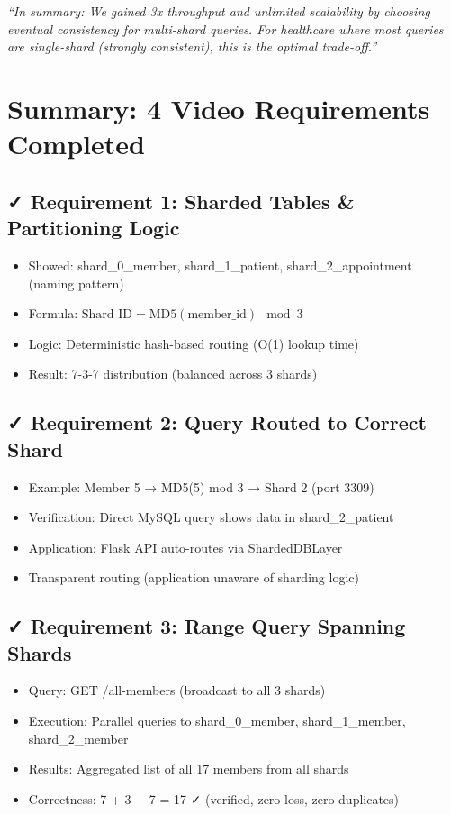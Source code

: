\documentclass[12pt]{article}
\begin{document}
\textit{``In summary: We gained 3x throughput and unlimited scalability by choosing eventual consistency for multi-shard queries. For healthcare where most queries are single-shard (strongly consistent), this is the optimal trade-off.''}

\newpage

\section*{Summary: 4 Video Requirements Completed}

\subsection*{✓ Requirement 1: Sharded Tables \& Partitioning Logic}
\begin{itemize}
    \item Showed: shard\_0\_member, shard\_1\_patient, shard\_2\_appointment (naming pattern)
    \item Formula: $\text{Shard ID} = \text{MD5}(\text{member\_id}) \mod 3$
    \item Logic: Deterministic hash-based routing (O(1) lookup time)
    \item Result: 7-3-7 distribution (balanced across 3 shards)
\end{itemize}

\subsection*{✓ Requirement 2: Query Routed to Correct Shard}
\begin{itemize}
    \item Example: Member 5 → MD5(5) mod 3 → Shard 2 (port 3309)
    \item Verification: Direct MySQL query shows data in shard\_2\_patient
    \item Application: Flask API auto-routes via ShardedDBLayer
    \item Transparent routing (application unaware of sharding logic)
\end{itemize}

\subsection*{✓ Requirement 3: Range Query Spanning Shards}
\begin{itemize}
    \item Query: GET /all-members (broadcast to all 3 shards)
    \item Execution: Parallel queries to shard\_0\_member, shard\_1\_member, shard\_2\_member
    \item Results: Aggregated list of all 17 members from all shards
    \item Correctness: 7 + 3 + 7 = 17 ✓ (verified, zero loss, zero duplicates)
\end{itemize}
\end{document}
